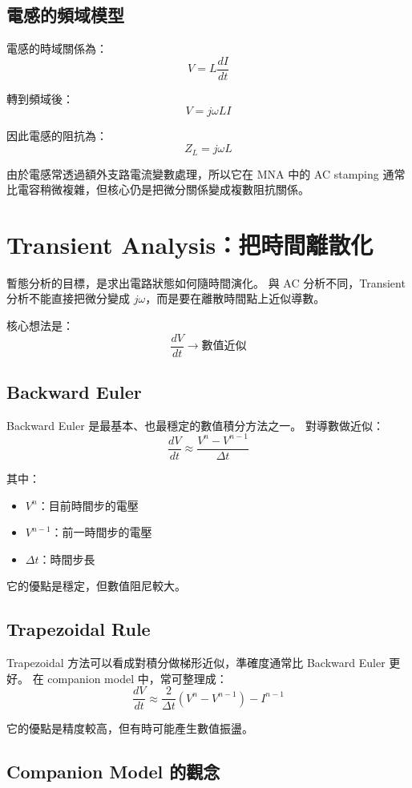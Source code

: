 \documentclass[12pt,a4paper]{article}
\begin{document}
\subsection{電感的頻域模型}

電感的時域關係為：
\[
V = L \frac{dI}{dt}
\]

轉到頻域後：
\[
V = j\omega L I
\]

因此電感的阻抗為：
\[
Z_L = j\omega L
\]

由於電感常透過額外支路電流變數處理，所以它在 MNA 中的 AC stamping 通常比電容稍微複雜，但核心仍是把微分關係變成複數阻抗關係。

\section{Transient Analysis：把時間離散化}

暫態分析的目標，是求出電路狀態如何隨時間演化。  
與 AC 分析不同，Transient 分析不能直接把微分變成 $j\omega$，而是要在離散時間點上近似導數。

核心想法是：
\[
\frac{dV}{dt} \rightarrow \text{數值近似}
\]

\subsection{Backward Euler}

Backward Euler 是最基本、也最穩定的數值積分方法之一。  
對導數做近似：
\[
\frac{dV}{dt} \approx \frac{V^n - V^{n-1}}{\Delta t}
\]

其中：
\begin{itemize}
\item $V^n$：目前時間步的電壓
\item $V^{n-1}$：前一時間步的電壓
\item $\Delta t$：時間步長
\end{itemize}

它的優點是穩定，但數值阻尼較大。

\subsection{Trapezoidal Rule}

Trapezoidal 方法可以看成對積分做梯形近似，準確度通常比 Backward Euler 更好。  
在 companion model 中，常可整理成：
\[
\frac{dV}{dt} \approx \frac{2}{\Delta t}(V^n - V^{n-1}) - I^{n-1}
\]

它的優點是精度較高，但有時可能產生數值振盪。

\subsection{Companion Model 的觀念}
\end{document}
